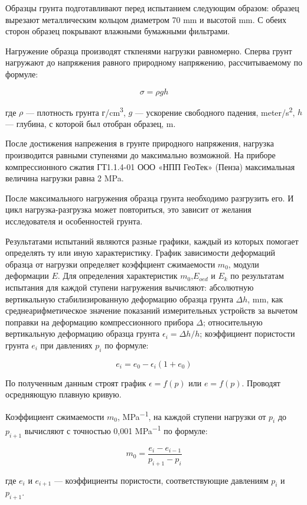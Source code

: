 Образцы грунта подготавливают перед испытанием следующим образом:
образец вырезают металлическим кольцом диаметром 70 \si{\milli\meter} 
и высотой \si{\milli\meter}. С обеих сторон образец покрывают 
влажными бумажными фильтрами. 

Нагружение образца производят сткпенями нагрузки равномерно. 
Сперва грунт нагружают до напряжения равного природному 
напряжению, рассчитываемому по формуле: 

\[
   \sigma = \rho g h
\]

где $\rho$ --- плотность грунта г/\si{\centi\meter^3},
$g$ --- ускорение свободного падения, \si{meter}/\si{\second^2},
$h$ --- глубина, с которой был отобран образец, \si{\meter}.

После достижения напрежения в грунте природного напряжения, нагрузка 
производится равными ступенями до максимально возможной. На приборе 
компрессионного сжатия ГТ1.1.4-01 ООО «НПП ГеоТек» (Пенза) максимальная 
величина нагрузки равна 2 \si{\mega\pascal}.

После максимального нагружения образца грунта необходимо разгрузить
его. И цикл нагрузка-разгрузка может повториться, это зависит от 
желания исследователя и особенностей грунта.

Результатами испытаний являются разные графики, каждый из которых 
помогает определять ту или иную характеристику. 
График зависимости деформаций образца от нагрузки 
определяет коэффциент сжимаемости $m_0$, 
модули деформации $E$.
Для определения характеристик $m_0$,$E_{oed}$ и $E_k$ 
по результатам
испытания для каждой ступени нагружения вычисляют:
абсолютную вертикальную стабилизированную деформацию образца
грунта $\Delta h$, \si{\milli\meter}, как среднеарифметическое значение показаний
измерительных устройств за вычетом поправки на деформацию
компрессионного прибора $\Delta$; относительную вертикальную деформацию образца грунта \(\epsilon_i = \Delta h/h\);
коэффициент пористости грунта $e_i$ при давлениях $p_i$ по формуле:

\[
   e_i = e_0 - \epsilon_i(1+e_0)
\]

По полученным данным строят график \(\epsilon = f(p)\) или
\(e = f(p)\). Проводят осредняющую плавную кривую.

Коэффициент сжимаемости $m_0$, \si{\mega\pascal^{-1}}, на каждой ступени нагрузки
от $p_i$ до $p_{i+1}$ вычисляют с точностью 0,001 \si{\mega\pascal^{-1}} по формуле:

\[
   m_0 = \frac{e_i - e_{i-1}}{p_{i+1} - p_i}
\]

где $e_i$ и $e_{i+1}$ --- коэффициенты пористости, соответствующие давлениям $p_i$ и $p_{i+1}$.

